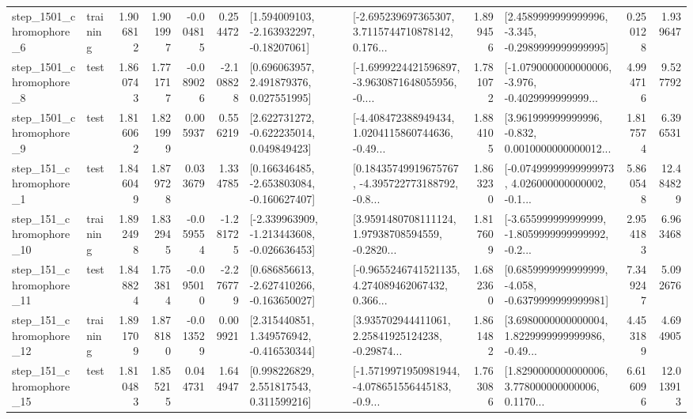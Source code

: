 \begin{tabular}{llrrrrllrlrr}
  step\_1501\_chromophore\_6 &  training &      1.906812 &    1.901997 &     -0.004815 &  0.254472 &    [1.594009103, -2.163932297, -0.18207061] &  [-2.695239697365307, 3.7115744710878142, 0.176... &       1.899456 &  [2.4589999999999996, -3.345, -0.2989999999999995] &            0.250128 &          1.939647 \\
  step\_1501\_chromophore\_8 &      test &      1.860743 &    1.771717 &     -0.089026 & -2.108828 &     [0.696063957, 2.491879376, 0.027551995] &  [-1.6999224421596897, -3.9630871648055956, -0.... &       1.781072 &  [-1.0790000000000006, -3.976, -0.4029999999999... &            4.994716 &          9.527792 \\
  step\_1501\_chromophore\_9 &      test &      1.816062 &    1.821999 &      0.005937 &  0.556219 &    [2.622731272, -0.622235014, 0.049849423] &  [-4.408472388949434, 1.0204115860744636, -0.49... &       1.884105 &  [3.961999999999996, -0.832, 0.0010000000000012... &            1.817574 &          6.396531 \\
   step\_151\_chromophore\_1 &      test &      1.846049 &    1.879728 &      0.033679 &  1.334785 &   [0.166346485, -2.653803084, -0.160627407] &  [0.18435749919675767, -4.395722773188792, -0.8... &       1.863230 &  [-0.07499999999999973, 4.026000000000002, -0.1... &            5.860548 &         12.484829 \\
  step\_151\_chromophore\_10 &  training &      1.892498 &    1.832945 &     -0.059554 & -1.281725 &  [-2.339963909, -1.213443608, -0.026636453] &  [3.9591480708111124, 1.97938708594559, -0.2820... &       1.817609 &  [-3.655999999999999, -1.8059999999999992, -0.2... &            2.954183 &          6.963468 \\
  step\_151\_chromophore\_11 &      test &      1.848824 &    1.753814 &     -0.095010 & -2.276779 &   [0.686856613, -2.627410266, -0.163650027] &  [-0.9655246741521135, 4.274089462067432, 0.366... &       1.682360 &  [0.6859999999999999, -4.058, -0.6379999999999981] &            7.349247 &          5.092676 \\
  step\_151\_chromophore\_12 &  training &      1.891709 &    1.878180 &     -0.013529 &  0.009921 &    [2.315440851, 1.349576942, -0.416530344] &  [3.935702944411061, 2.25841925124238, -0.29874... &       1.861482 &  [3.6980000000000004, 1.8229999999999986, -0.49... &            4.453189 &          4.694905 \\
  step\_151\_chromophore\_15 &      test &      1.810483 &    1.855215 &      0.044731 &  1.644947 &     [0.998226829, 2.551817543, 0.311599216] &  [-1.5719971950981944, -4.078651556445183, -0.9... &       1.763086 &  [1.8290000000000006, 3.778000000000006, 0.1170... &            6.616096 &         12.013913 \\

\end{tabular}

